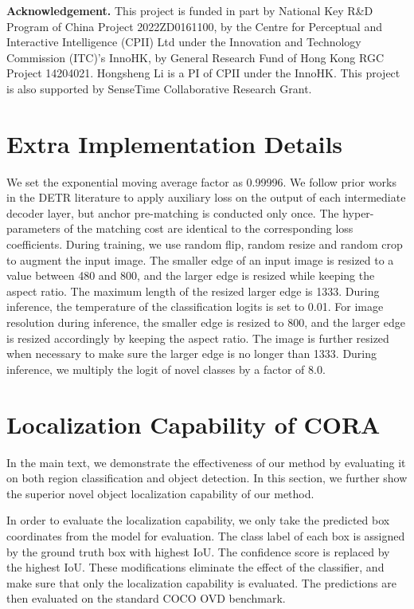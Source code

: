 \documentclass[10pt,twocolumn,letterpaper]{article}
\begin{document}
\noindent\textbf{Acknowledgement.}
This project is funded in part by National Key R\&D Program of China Project 2022ZD0161100, by the Centre for Perceptual and Interactive Intelligence (CPII) Ltd under the Innovation and Technology Commission (ITC)'s InnoHK, by General Research Fund of Hong Kong RGC Project 14204021. 
Hongsheng Li is a PI of CPII under the InnoHK.
This project is also supported by SenseTime Collaborative Research Grant.


{\small


}
\clearpage
\appendix
\section{Extra Implementation Details}
We set the exponential moving average factor as 0.99996. 
We follow prior works in the DETR literature to apply auxiliary loss on the output of each intermediate decoder layer, but anchor pre-matching is conducted only once.
The hyper-parameters of the matching cost are identical to the corresponding loss coefficients.
During training, we use random flip, random resize and random crop to augment the input image.
The smaller edge of an input image is resized to a value between 480 and 800, and the larger edge is resized while keeping the aspect ratio.
The maximum length of the resized larger edge is 1333.
During inference, the temperature  of the classification logits is set to 0.01.
For image resolution during inference, the smaller edge is resized to 800, and the larger edge is resized accordingly by keeping the aspect ratio. 
The image is further resized when necessary to make sure the larger edge is no longer than 1333.
During inference, we multiply the logit of novel classes by a factor of 8.0.

\section{Localization Capability of CORA}
In the main text, we demonstrate the effectiveness of our method by evaluating it on both region classification and object detection.
In this section, we further show the superior novel object localization capability of our method.

In order to evaluate the localization capability, we only take the predicted box coordinates from the model for evaluation.
The class label of each box is assigned by the ground truth box with highest IoU.
The confidence score is replaced by the highest IoU.
These modifications eliminate the effect of the classifier, and make sure that only the localization capability is evaluated.
The predictions are then evaluated on the standard COCO OVD benchmark.
\end{document}
